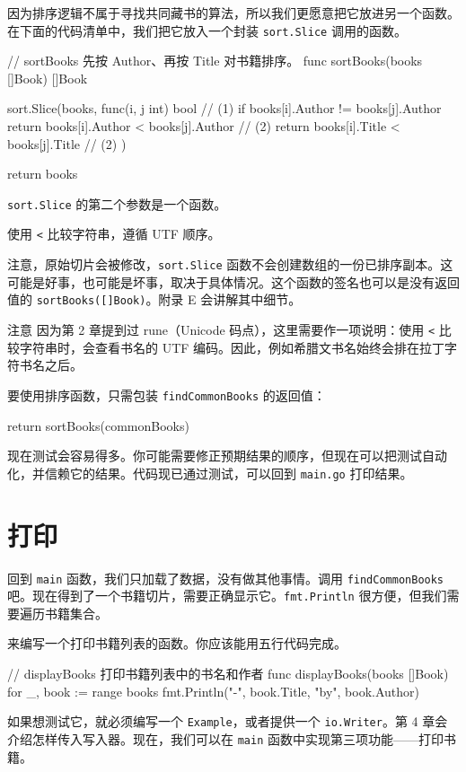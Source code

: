 因为排序逻辑不属于寻找共同藏书的算法，所以我们更愿意把它放进另一个函数。在下面的代码清单中，我们把它放入一个封装 \texttt{sort.Slice} 调用的函数。

\begin{gocode}[title={代码清单 3.18 \texttt{bookworm.go}：对书籍排序}]
// sortBooks 先按 Author、再按 Title 对书籍排序。
func sortBooks(books []Book) []Book {
    sort.Slice(books, func(i, j int) bool { // (1)
        if books[i].Author != books[j].Author {
            return books[i].Author < books[j].Author // (2)
        }
        return books[i].Title < books[j].Title // (2)
    })

    return books
}
\end{gocode}

\begin{codeannotations}
  \item \texttt{sort.Slice} 的第二个参数是一个函数。
  \item 使用 \texttt{<} 比较字符串，遵循 UTF 顺序。
\end{codeannotations}

注意，原始切片会被修改，\texttt{sort.Slice} 函数不会创建数组的一份已排序副本。这可能是好事，也可能是坏事，取决于具体情况。这个函数的签名也可以是没有返回值的 \texttt{sortBooks([]Book)}。附录 E 会讲解其中细节。

\begin{infobox}{注意}
因为第 2 章提到过 rune（Unicode 码点），这里需要作一项说明：使用 \texttt{<} 比较字符串时，会查看书名的 UTF 编码。因此，例如希腊文书名始终会排在拉丁字符书名之后。
\end{infobox}

要使用排序函数，只需包装 \texttt{findCommonBooks} 的返回值：

\begin{gocode}[]
return sortBooks(commonBooks)
\end{gocode}

现在测试会容易得多。你可能需要修正预期结果的顺序，但现在可以把测试自动化，并信赖它的结果。代码现已通过测试，可以回到 \texttt{main.go} 打印结果。

\section{打印}

回到 \texttt{main} 函数，我们只加载了数据，没有做其他事情。调用 \texttt{findCommonBooks} 吧。现在得到了一个书籍切片，需要正确显示它。\texttt{fmt.Println} 很方便，但我们需要遍历书籍集合。

来编写一个打印书籍列表的函数。你应该能用五行代码完成。

\begin{gocode}[title={代码清单 3.19 \texttt{bookworms.go}：\texttt{displayBooks}}]
// displayBooks 打印书籍列表中的书名和作者
func displayBooks(books []Book) {
    for _, book := range books {
        fmt.Println("-", book.Title, "by", book.Author)
    }
}
\end{gocode}

如果想测试它，就必须编写一个 \texttt{Example}，或者提供一个 \texttt{io.Writer}。第 4 章会介绍怎样传入写入器。现在，我们可以在 \texttt{main} 函数中实现第三项功能——打印书籍。
